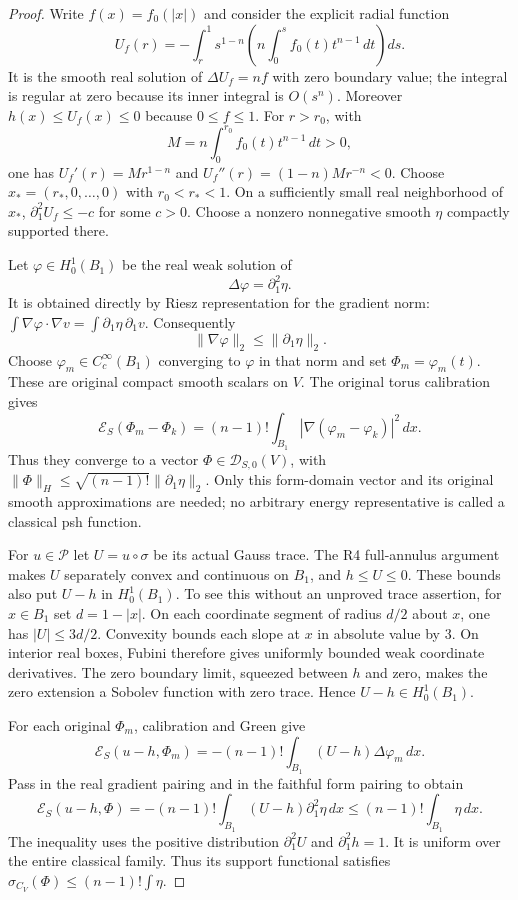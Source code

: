 \documentclass[11pt,a4paper]{article}
\numberwithin{equation}{section}
\theoremstyle{definition}
\theoremstyle{remark}
\begin{document}
\begin{proof}
Write $f(x)=f_0(|x|)$ and consider the explicit radial function
\[
 U_f(r)=-\int_r^1 s^{1-n}
                   \left(n\int_0^s f_0(t)t^{n-1}\,dt\right)ds.
\]
It is the smooth real solution of $\Delta U_f=nf$ with zero boundary
value; the integral is regular at zero because its inner integral is
$O(s^n)$. Moreover $h(x)\le U_f(x)\le0$ because $0\le f\le1$.
For $r>r_0$, with
\[
                  M=n\int_0^{r_0} f_0(t)t^{n-1}\,dt>0,
\]
one has $U_f'(r)=Mr^{1-n}$ and
$U_f''(r)=(1-n)Mr^{-n}<0$.
Choose $x_*=(r_*,0,\ldots,0)$ with $r_0<r_*<1$.
On a sufficiently small real neighborhood of $x_*$,
$\partial_1^2U_f\le-c$ for some $c>0$.
Choose a nonzero nonnegative smooth $\eta$ compactly supported there.

Let $\varphi\in H_0^1(B_1)$ be the real weak solution of
\[
                     \Delta\varphi=\partial_1^2\eta.
\]
It is obtained directly by Riesz representation for the gradient norm:
$\int\nabla\varphi\cdot\nabla v=\int\partial_1\eta\,\partial_1v$.
Consequently
\begin{equation}
                     \|\nabla\varphi\|_2\le\|\partial_1\eta\|_2.
 \label{eq:r6-real-test-energy}
\end{equation}
Choose $\varphi_m\in C_c^\infty(B_1)$ converging to $\varphi$ in that
norm and set $\Phi_m=\varphi_m(t)$. These are original compact smooth
scalars on $V$. The original torus calibration gives
\[
       \mathcal E_S(\Phi_m-\Phi_k)
            =(n-1)!\int_{B_1}|\nabla(\varphi_m-\varphi_k)|^2\,dx.
\]
Thus they converge to a vector $\Phi\in\mathscr D_{S,0}(V)$, with
$\|\Phi\|_H\le\sqrt{(n-1)!}\|\partial_1\eta\|_2$.
Only this form-domain vector and its original smooth approximations are
needed; no arbitrary energy representative is called a classical psh
function.

For $u\in\mathscr P$ let $U=u\circ\sigma$ be its actual Gauss trace.
The R4 full-annulus argument makes $U$ separately convex and continuous
on $B_1$, and $h\le U\le0$. These bounds also put $U-h$ in
$H_0^1(B_1)$. To see this without an unproved trace assertion, for
$x\in B_1$ set $d=1-|x|$. On each coordinate segment of radius $d/2$
about $x$, one has $|U|\le3d/2$. Convexity bounds each slope at $x$
in absolute value by $3$. On interior real boxes, Fubini therefore
gives uniformly bounded weak coordinate derivatives. The zero boundary
limit, squeezed between $h$ and zero, makes the zero extension a
Sobolev function with zero trace. Hence $U-h\in H_0^1(B_1)$.

For each original $\Phi_m$, calibration and Green give
\[
 \mathcal E_S(u-h,\Phi_m)
       =-(n-1)!\int_{B_1}(U-h)\Delta\varphi_m\,dx.
\]
Pass in the real gradient pairing and in the faithful form pairing to
obtain
\[
 \mathcal E_S(u-h,\Phi)
       =-(n-1)!\int_{B_1}(U-h)\partial_1^2\eta\,dx
       \le(n-1)!\int_{B_1}\eta\,dx.
\]
The inequality uses the positive distribution $\partial_1^2U$ and
$\partial_1^2h=1$. It is uniform over the entire classical family.
Thus its support functional satisfies
$\sigma_{C_V}(\Phi)\le(n-1)!\int\eta$.


\end{proof}
\end{document}
